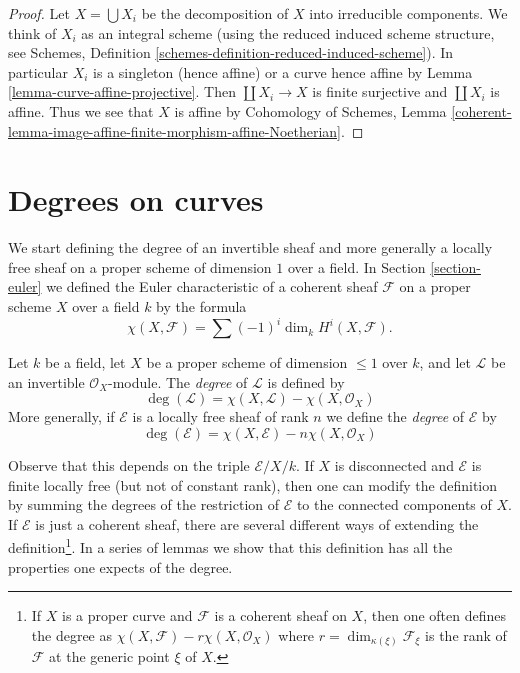\begin{proof}
Let $X = \bigcup X_i$ be the decomposition of $X$ into irreducible components.
We think of $X_i$ as an integral scheme (using the reduced induced scheme
structure, see Schemes, Definition
\ref{schemes-definition-reduced-induced-scheme}).
In particular $X_i$ is a singleton (hence affine) or a curve
hence affine by Lemma \ref{lemma-curve-affine-projective}.
Then $\coprod X_i \to X$ is finite surjective and $\coprod X_i$ is affine.
Thus we see that $X$ is affine by
Cohomology of Schemes, Lemma
\ref{coherent-lemma-image-affine-finite-morphism-affine-Noetherian}.
\end{proof}






\section{Degrees on curves}
\label{section-divisors-curves}

\noindent
We start defining the degree of an invertible sheaf and more generally
a locally free sheaf on a proper scheme
of dimension $1$ over a field. In Section \ref{section-euler}
we defined the Euler characteristic
of a coherent sheaf $\mathcal{F}$ on a proper scheme $X$ over a field
$k$ by the formula
$$
\chi(X, \mathcal{F}) = \sum (-1)^i \dim_k H^i(X, \mathcal{F}).
$$

\begin{definition}
\label{definition-degree-invertible-sheaf}
Let $k$ be a field, let $X$ be a proper scheme of dimension $\leq 1$
over $k$, and let $\mathcal{L}$ be an invertible $\mathcal{O}_X$-module.
The {\it degree} of $\mathcal{L}$ is defined by
$$
\deg(\mathcal{L}) = \chi(X, \mathcal{L}) - \chi(X, \mathcal{O}_X)
$$
More generally, if $\mathcal{E}$ is a locally free sheaf of rank $n$
we define the {\it degree} of $\mathcal{E}$ by
$$
\deg(\mathcal{E}) = \chi(X, \mathcal{E}) - n\chi(X, \mathcal{O}_X)
$$
\end{definition}

\noindent
Observe that this depends on the triple $\mathcal{E}/X/k$.
If $X$ is disconnected and $\mathcal{E}$ is finite locally free (but not
of constant rank), then one can modify the definition by summing the degrees
of the restriction of $\mathcal{E}$ to the connected components of $X$.
If $\mathcal{E}$ is just a coherent sheaf, there are several different
ways of extending the definition\footnote{If $X$ is a proper curve
and $\mathcal{F}$ is a coherent sheaf on $X$, then one often defines
the degree as $\chi(X, \mathcal{F}) - r\chi(X, \mathcal{O}_X)$
where $r = \dim_{\kappa(\xi)} \mathcal{F}_\xi$ is the rank of $\mathcal{F}$
at the generic point $\xi$ of $X$.}.
In a series of lemmas we show that this definition has all the properties
one expects of the degree.

